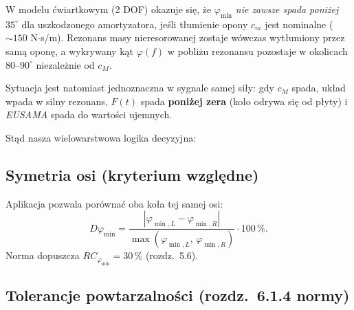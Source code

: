 \documentclass[11pt,a4paper]{article}
\theoremstyle{plainpol}
\begin{document}
\begin{uwagabox}
W modelu ćwiartkowym (2 DOF) okazuje się, że $\varphi_{\min}$ \emph{nie
zawsze spada poniżej $35^\circ$} dla uszkodzonego amortyzatora, jeśli
tłumienie opony $c_m$ jest nominalne ($\sim 150$ N$\cdot$s/m). Rezonans
masy nieresorowanej zostaje wówczas wytłumiony przez samą oponę,
a wykrywany kąt $\varphi(f)$ w pobliżu rezonansu pozostaje w okolicach
$80$--$90^\circ$ niezależnie od $c_M$.

Sytuacja jest natomiast jednoznaczna w sygnale samej siły: gdy $c_M$
spada, układ wpada w silny rezonans, $F(t)$ spada \textbf{poniżej zera}
(koło odrywa się od płyty) i \emph{EUSAMA} spada do wartości ujemnych.
\end{uwagabox}

Stąd nasza wielowarstwowa logika decyzyjna:

\begin{center}
\end{center}

\subsection{Symetria osi (kryterium względne)}

Aplikacja pozwala porównać oba koła tej samej osi:
\begin{equation}
  D\varphi_{\min} = \dfrac{|\varphi_{\min,L} - \varphi_{\min,R}|}{\max(\varphi_{\min,L},\,\varphi_{\min,R})}\cdot 100\,\%.
\end{equation}
Norma dopuszcza $RC_{\varphi_{\min}} = 30\,\%$ (rozdz.~5.6).

\subsection{Tolerancje powtarzalności (rozdz.~6.1.4 normy)}
\end{document}
